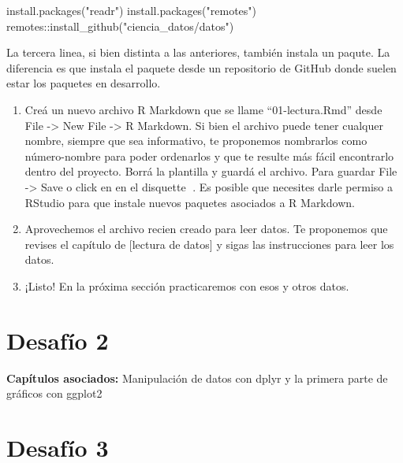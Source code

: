 \documentclass[
  openany]{book}
\newenvironment{Shaded}{\begin{snugshade}}{\end{snugshade}}
\newcommand{\FunctionTok}[1]{\textcolor[rgb]{0.00,0.00,0.00}{#1}}
\newcommand{\NormalTok}[1]{#1}
\newcommand{\SpecialCharTok}[1]{\textcolor[rgb]{0.00,0.00,0.00}{#1}}
\newcommand{\StringTok}[1]{\textcolor[rgb]{0.31,0.60,0.02}{#1}}
\begin{document}
\begin{Shaded}
\begin{Highlighting}[]
\FunctionTok{install.packages}\NormalTok{(}\StringTok{"readr"}\NormalTok{)}
\FunctionTok{install.packages}\NormalTok{(}\StringTok{"remotes"}\NormalTok{)}
\NormalTok{remotes}\SpecialCharTok{::}\FunctionTok{install\_github}\NormalTok{(}\StringTok{"ciencia\_datos/datos"}\NormalTok{)}
\end{Highlighting}
\end{Shaded}

La tercera linea, si bien distinta a las anteriores, también instala un paqute. La diferencia es que instala el paquete desde un repositorio de GitHub donde suelen estar los paquetes en desarrollo.

\begin{enumerate}
\def\labelenumi{\arabic{enumi}.}
\setcounter{enumi}{3}
\item
  Creá un nuevo archivo R Markdown que se llame ``01-lectura.Rmd'' desde File -\textgreater{} New File -\textgreater{} R Markdown. Si bien el archivo puede tener cualquer nombre, siempre que sea informativo, te proponemos nombrarlos como número-nombre para poder ordenarlos y que te resulte más fácil encontrarlo dentro del proyecto. Borrá la plantilla y guardá el archivo. Para guardar File -\textgreater{} Save o click en en el disquette 💾. Es posible que necesites darle permiso a RStudio para que instale nuevos paquetes asociados a R Markdown.
\item
  Aprovechemos el archivo recien creado para leer datos. Te proponemos que revises el capítulo de {[}lectura de datos{]} y sigas las instrucciones para leer los datos.
\item
  ¡Listo! En la próxima sección practicaremos con esos y otros datos.
\end{enumerate}

\hypertarget{desafuxedo-2}{%
\section{Desafío 2}\label{desafuxedo-2}}

\textbf{Capítulos asociados:} Manipulación de datos con dplyr y la primera parte de gráficos con ggplot2

\hypertarget{desafuxedo-3}{%
\section{Desafío 3}\label{desafuxedo-3}}
\end{document}
